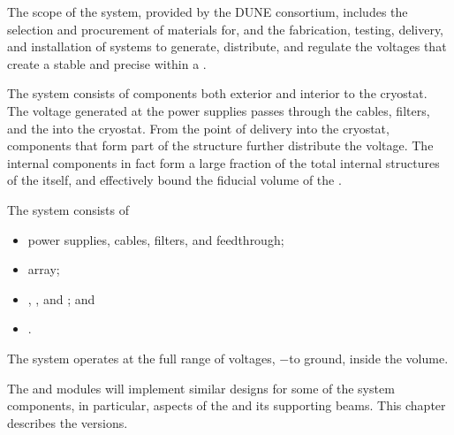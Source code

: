 
The scope of the \single {} system, provided by the DUNE  consortium, includes the selection and procurement of materials for, and the fabrication, testing, delivery, and installation of systems to generate, distribute, and regulate the voltages that
create a stable and precise \efield{} within a . 

The  system consists of components both exterior and interior to the cryostat. The voltage generated at the  power supplies passes through the cables, filters, and the  \fdth into the cryostat. From the point of delivery into the cryostat, components that form part of the  structure further distribute the voltage. The internal  components in fact form a large fraction of the total internal structures of the  itself, and  
 effectively bound the  fiducial volume of the %
 . %

The   system consists of
\begin{itemize}
\item {} power supplies, cables, filters, and feedthrough;
\item {} array;
\item {}, , and ; and
\item {}.
\end{itemize}


The system operates at the full range of voltages, %
$-$\sptargetdriftvoltpos to ground, inside the  volume. 

The   and   modules will implement similar designs for some
 of the  system components, %
 in particular, aspects of the  and its supporting beams. This chapter describes the   versions. 
 
